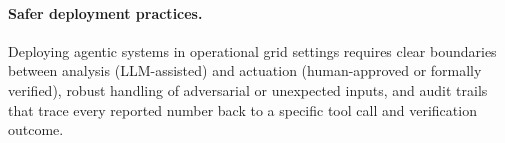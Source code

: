 \documentclass[journal,onecolumn]{IEEEtran} %
\begin{document}
\paragraph{Safer deployment practices.}
Deploying agentic systems in operational grid settings requires clear boundaries between analysis (LLM-assisted) and actuation (human-approved or formally verified), robust handling of adversarial or unexpected inputs, and audit trails that trace every reported number back to a specific tool call and verification outcome.








\end{document}
